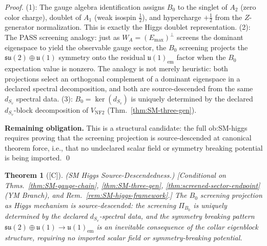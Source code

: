 \documentclass[12pt,oneside]{amsbook}
\theoremstyle{plain}
\newtheorem{theorem}{Theorem}[section]
\theoremstyle{definition}
\theoremstyle{remark}
\newcommand{\status}[1]{\textup{[#1]}}
\begin{document}
\begin{proof}
(1): The gauge algebra identification assigns $B_0$ to the singlet
of $A_2$ (zero color charge), doublet of $A_1$ (weak isospin
$\tfrac{1}{2}$), and hypercharge $+\tfrac{1}{2}$ from the $Z$-generator
normalization. This is exactly the Higgs doublet representation.
(2): The PASS screening analogy: just as $W_A = (E_{\max})^\perp$
screens the dominant eigenspace to yield the observable gauge sector,
the $B_0$ screening projects the $\mathfrak{su}(2)\oplus\mathfrak{u}(1)$
symmetry onto the residual $\mathfrak{u}(1)_{\mathrm{em}}$ factor when
the $B_0$ expectation value is nonzero. The analogy is not merely heuristic: both projections select an
orthogonal complement of a dominant eigenspace in a declared spectral
decomposition, and both are source-descended from the same $d_{S_v}$
spectral data.
(3): $B_0 = \ker(d_{S_v})$ is uniquely determined by the declared
$d_{S_v}$-block decomposition of $V_{\mathrm{NF2}}$ (Thm.~\ref{thm:SM-three-gen}).

\textbf{Remaining obligation.} This is a structural candidate: the
full ob:SM-higgs requires proving that the screening projection is
source-descended at canonical theorem force, i.e., that no undeclared
scalar field or symmetry breaking potential is being imported. \qed
\end{proof}

\begin{theorem}[\status{C}]\label{thm:SM-higgs-source-descended}
\textup{(SM Higgs Source-Descendedness.)}
\textup{[Conditional on Thms.~\ref{thm:SM-gauge-chain},
\ref{thm:SM-three-gen}, \ref{thm:screened-sector-endpoint}
(YM Branch), and Rem.~\ref{rem:SM-higgs-framework}.]}
The $B_0$ screening projection as Higgs mechanism is
source-descended: the screening $\Pi_{B_0}$ is uniquely
determined by the declared $d_{S_v}$-spectral data, and the
symmetry breaking pattern $\mathfrak{su}(2)\oplus\mathfrak{u}(1)
\to \mathfrak{u}(1)_{\mathrm{em}}$ is an inevitable consequence
of the collar eigenblock structure, requiring no imported scalar
field or symmetry-breaking potential.
\end{theorem}
\end{document}
